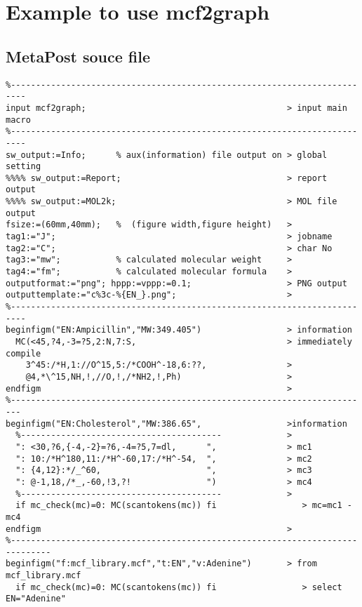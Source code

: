 \documentclass[a4paper]{article}
\begin{document}
\section{Example to use mcf2graph}
\subsection{MetaPost souce file}
%
%
%
%
\begin{verbatim}
%-------------------------------------------------------------------------
input mcf2graph;                                        > input main macro
%-------------------------------------------------------------------------
sw_output:=Info;      % aux(information) file output on > global setting
%%%% sw_output:=Report;                                 > report output
%%%% sw_output:=MOL2k;                                  > MOL file output
fsize:=(60mm,40mm);   %  (figure width,figure height)   >
tag1:="J";                                              > jobname
tag2:="C";                                              > char No
tag3:="mw";           % calculated molecular weight     > 
tag4:="fm";           % calculated molecular formula    >
outputformat:="png"; hppp:=vppp:=0.1;                   > PNG output
outputtemplate:="c%3c-%{EN_}.png";                      >
%-------------------------------------------------------------------------
beginfigm("EN:Ampicillin","MW:349.405")                 > information
  MC(<45,?4,-3=?5,2:N,7:S,                              > immediately compile
    3^45:/*H,1://O^15,5:/*COOH^-18,6:??,                >
    @4,*\^15,NH,!,//O,!,/*NH2,!,Ph)                     >
endfigm                                                 >
%------------------------------------------------------------------------
beginfigm("EN:Cholesterol","MW:386.65",                 >information
  %----------------------------------------             >
  ": <30,?6,{-4,-2}=?6,-4=?5,7=dl,      ",              > mc1
  ": 10:/*H^180,11:/*H^-60,17:/*H^-54,  ",              > mc2
  ": {4,12}:*/_^60,                     ",              > mc3
  ": @-1,18,/*_,-60,!3,?!               ")              > mc4
  %----------------------------------------             >
  if mc_check(mc)=0: MC(scantokens(mc)) fi                 > mc=mc1 - mc4
endfigm                                                 >
%------------------------------------------------------------------------------
beginfigm("f:mcf_library.mcf","t:EN","v:Adenine")       > from mcf_library.mcf
  if mc_check(mc)=0: MC(scantokens(mc)) fi                 > select EN="Adenine"

\end{verbatim}
\end{document}

